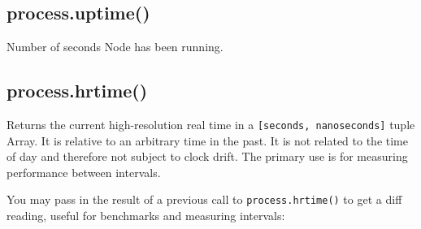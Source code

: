 \subsection{process.uptime()}

Number of seconds Node has been running.

\subsection{process.hrtime()}

Returns the current high-resolution real time in a
\texttt{{[}seconds, nanoseconds{]}} tuple Array. It is relative to an
arbitrary time in the past. It is not related to the time of day and
therefore not subject to clock drift. The primary use is for measuring
performance between intervals.

You may pass in the result of a previous call to
\texttt{process.hrtime()} to get a diff reading, useful for benchmarks
and measuring intervals:

\begin{Shaded}
\end{Shaded}


